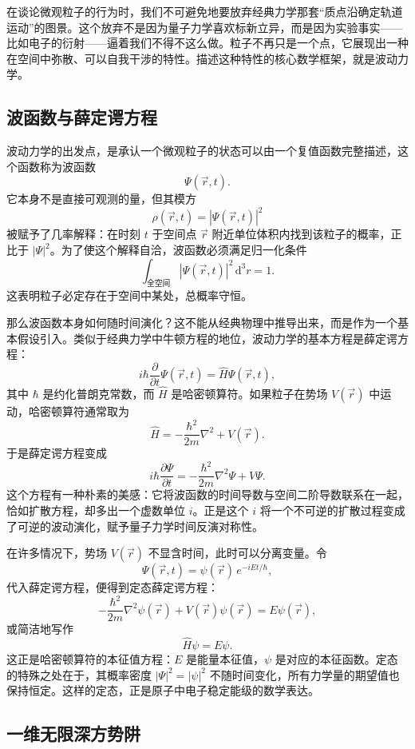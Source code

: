 \documentclass[UTF8]{ctexbook}
\begin{document}
在谈论微观粒子的行为时，我们不可避免地要放弃经典力学那套“质点沿确定轨道运动”的图景。这个放弃不是因为量子力学喜欢标新立异，而是因为实验事实——比如电子的衍射——逼着我们不得不这么做。粒子不再只是一个点，它展现出一种在空间中弥散、可以自我干涉的特性。描述这种特性的核心数学框架，就是波动力学。

\subsection{波函数与薛定谔方程}

波动力学的出发点，是承认一个微观粒子的状态可以由一个复值函数完整描述，这个函数称为波函数
\[
\Psi(\vec{r}, t).
\]
它本身不是直接可观测的量，但其模方
\[
\rho(\vec{r}, t) = |\Psi(\vec{r}, t)|^2
\]
被赋予了几率解释：在时刻 $t$ 于空间点 $\vec{r}$ 附近单位体积内找到该粒子的概率，正比于 $|\Psi|^2$。为了使这个解释自洽，波函数必须满足归一化条件
\[
\int_{\text{全空间}} |\Psi(\vec{r}, t)|^2 \,\mathrm{d}^3r = 1.
\]
这表明粒子必定存在于空间中某处，总概率守恒。

那么波函数本身如何随时间演化？这不能从经典物理中推导出来，而是作为一个基本假设引入。类似于经典力学中牛顿方程的地位，波动力学的基本方程是薛定谔方程：
\[
i\hbar \frac{\partial}{\partial t} \Psi(\vec{r}, t) = \hat{H} \Psi(\vec{r}, t),
\]
其中 $\hbar$ 是约化普朗克常数，而 $\hat{H}$ 是哈密顿算符。如果粒子在势场 $V(\vec{r})$ 中运动，哈密顿算符通常取为
\[
\hat{H} = -\frac{\hbar^2}{2m} \nabla^2 + V(\vec{r}).
\]
于是薛定谔方程变成
\[
i\hbar \frac{\partial \Psi}{\partial t} = -\frac{\hbar^2}{2m} \nabla^2 \Psi + V \Psi.
\]
这个方程有一种朴素的美感：它将波函数的时间导数与空间二阶导数联系在一起，恰如扩散方程，却多出一个虚数单位 $i$。正是这个 $i$ 将一个不可逆的扩散过程变成了可逆的波动演化，赋予量子力学时间反演对称性。

在许多情况下，势场 $V(\vec{r})$ 不显含时间，此时可以分离变量。令
\[
\Psi(\vec{r}, t) = \psi(\vec{r}) \, e^{-iEt/\hbar},
\]
代入薛定谔方程，便得到定态薛定谔方程：
\[
-\frac{\hbar^2}{2m} \nabla^2 \psi(\vec{r}) + V(\vec{r}) \psi(\vec{r}) = E \psi(\vec{r}),
\]
或简洁地写作
\[
\hat{H} \psi = E \psi.
\]
这正是哈密顿算符的本征值方程：$E$ 是能量本征值，$\psi$ 是对应的本征函数。定态的特殊之处在于，其概率密度 $|\Psi|^2 = |\psi|^2$ 不随时间变化，所有力学量的期望值也保持恒定。这样的定态，正是原子中电子稳定能级的数学表达。

\subsection{一维无限深方势阱}
\end{document}
